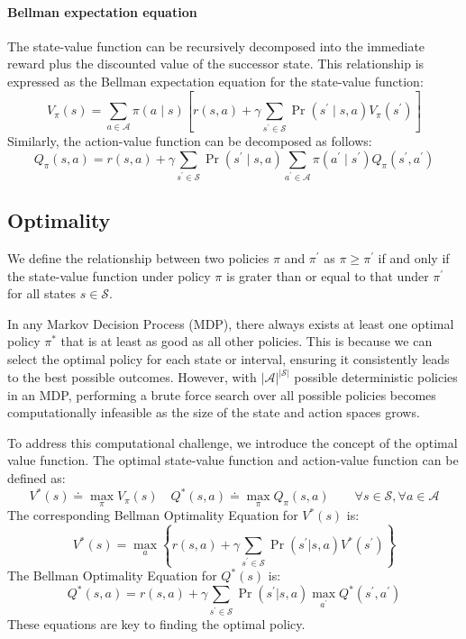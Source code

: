 \paragraph*{Bellman expectation equation}
The state-value function can be recursively decomposed into the immediate reward plus the discounted value of the successor state.
This relationship is expressed as the Bellman expectation equation for the state-value function:
\[V_{\pi}(s) = \sum_{a\in\mathcal{A}}\pi(a\mid s)\left[r(s,a)+\gamma\sum_{s^\prime\in\mathcal{S}}\Pr(s^\prime\mid s,a)V_{\pi}(s^\prime)\right]\]
Similarly, the action-value function can be decomposed as follows:
\[ Q_{\pi}(s,a)= r(s,a) + \gamma \sum_{s^\prime \in \mathcal{S}} \Pr(s^\prime \mid s, a) \sum_{a^\prime \in \mathcal{A}} \pi(a^\prime \mid s^\prime) Q_{\pi}(s^\prime, a^\prime)\]

\subsection{Optimality}
We define the relationship between two policies $\pi$ and $\pi^\prime$ as $\pi\geq\pi^\prime$ if and only if the state-value function under policy $\pi$ is grater than or equal to that under $\pi^\prime$ for all states $s \in \mathcal{S}$. 

In any Markov Decision Process (MDP), there always exists at least one optimal policy $\pi^\ast$ that is at least as good as all other policies. 
This is because we can select the optimal policy for each state or interval, ensuring it consistently leads to the best possible outcomes.
However, with $\left\lvert \mathcal{A}\right\rvert^{\left\lvert \mathcal{S}\right\rvert}$ possible deterministic policies in an MDP, performing a brute force search over all possible policies becomes computationally infeasible as the size of the state and action spaces grows.

To address this computational challenge, we introduce the concept of the optimal value function. The optimal state-value function and action-value function can be defined as:
\[ V^\ast(s) \doteq \max_{\pi} V_{\pi}(s) \quad Q^\ast(s,a) \doteq \max_{\pi} Q_{\pi}(s,a) \qquad \forall s \in \mathcal{S}, \forall a \in \mathcal{A}\]
The corresponding Bellman Optimality Equation for $V^\ast(s)$ is: 
\[V^\ast(s) = \max_a \left\{ r(s,a) + \gamma \sum_{s^\prime \in \mathcal{S}} \Pr(s^\prime | s, a) V^\ast(s^\prime) \right\}\]
The Bellman Optimality Equation for $Q^\ast(s)$ is: 
\[Q^\ast(s,a)=r(s,a)+\gamma\sum_{s^\prime\in\mathcal{S}}\Pr(s^\prime|s,a)\max_{a^\prime}Q^\ast(s^\prime,a^\prime)\]
These equations are key to finding the optimal policy. 

